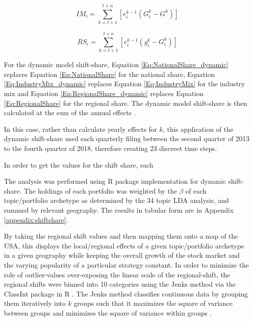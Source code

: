 \begin{equation}
    IM_{i} = \sum_{k=t+1}^{t+n}[e^{k-1}_i(G^{k}_{i}-G^{k})]
     \label{Eq:IndustryMix_dynamic}
\end{equation}

\begin{equation}
    RS_{i} = \sum_{k=t+1}^{t+n}[e^{k-1}_i(g^{k}_{i} - G^{k}_{i} )]
        \label{Eq:RegionalShare_dynamic}
\end{equation}

For the dynamic model shift-share, Equation \ref{Eq:NationalShare_dynamic} replaces Equation \ref{Eq:NationalShare} for the national share, Equation \ref{Eq:IndustryMix_dynamic} replaces Equation \ref{Eq:IndustryMix}  for the industry mix and Equation \ref{Eq:RegionalShare_dynamic} replaces Equation \ref{Eq:RegionalShare} for the regional share.  The dynamic model shift-share is then calculated at the sum of the annual effects \citep{BarffKnight88}.  

In this case, rather than calculate yearly effects for $k$, this application of the dynamic shift-share used each quarterly filing between the second quarter of 2013 to the fourth quarter of 2018, therefore creating 23 discreet time steps.

In order to get the values for the shift share, each 


The analysis was performed using \cite{Soudis2019} R package implementation for dynamic shift-share. The holdings of each portfolio was weighted by the $\beta$ of each topic/portfolio archetype as determined by the 34 topic LDA analysis, and summed by relevant geography. The results in tabular form are in Appendix \ref{appendix:shiftshare}.

By taking the regional shift values and then mapping them onto a map of the USA, this displays the local/regional effects of a given topic/portfolio archetype in a given geography while keeping the overall growth of the stock market and the varying popularity of a particular strategy constant. In order to minimize the role of outlier-values over-exposing the linear scale of the regional-shift, the regional shifts were binned into 10 categories using the Jenks method via the ClassInt package in R \citep{classInt}.  The Jenks method classifies continuous data by grouping them iteratively into $k$ groups such that it maximizes the square of variance between groups and minimizes the square of variance within groups \citep{jenks1967data}.  





